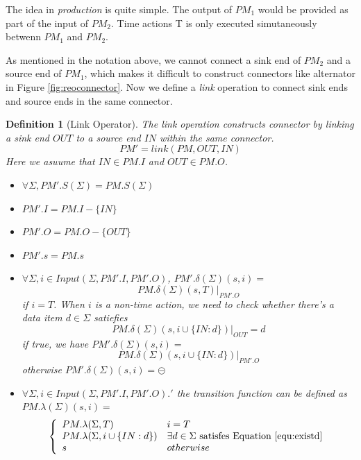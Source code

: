 \documentclass[conference, a4paper]{IEEEtran}
\newtheorem{definition}{Definition}
\newcommand{\rblock}[0]{\circleddash}
\begin{document}
The idea in \emph{production} is quite simple. The output of $PM_1$ would be provided as part of the
input of $PM_2$. Time actions T is only executed simutaneously betwenn $PM_1$ and $PM_2$.

As mentioned in the notation above, we cannot connect a sink end of $PM_2$ and a source end of
$PM_1$, which makes it difficult to construct connectors like alternator in Figure
\ref{fig:reoconnector}. Now we define a \emph{link} operation to connect sink ends and source ends
in the same connector.

\begin{definition}[Link Operator]
  The \emph{link} operation constructs connector by linking a sink end $OUT$ to a source end $IN$
  within the same connector.   
  \[
  PM' = link(PM, OUT, IN)
  \]
  Here we asuume that $IN\in PM.I$ and $OUT\in PM.O$.

  \begin{itemize}
  	\item[-] $\forall\Sigma, PM'.S(\Sigma)=PM.S(\Sigma)$
    \item[-] $PM'.I=PM.I-\{IN\}$
    \item[-] $PM'.O=PM.O-\{OUT\}$
    \item[-] $PM'.s=PM.s$
    \item[-] $\forall\Sigma, i\in Input(\Sigma,PM'.I,PM'.O)$, $PM'.\delta(\Sigma)(s, i)=$
      \begin{equation}
        \label{equ:existd}
        PM.\delta(\Sigma)(s,T)|_{PM'.O}
      \end{equation}
      if $i=T$. When $i$ is a non-time action, we need to check whether there's a data item
      $d\in\Sigma$
      satiefies
      \[
      PM.\delta(\Sigma)(s,i\cup\{IN:d\})|_{OUT} = d
      \]
      if \emph{true}, we have $PM'.\delta(\Sigma)(s, i)=$
      \[
      PM.\delta(\Sigma)(s,i\cup\{IN:d\})|_{PM'.O}
      \]
      otherwise $PM'.\delta(\Sigma)(s, i)=\rblock$
    \item[-] $\forall\Sigma, i\in Input(\Sigma,PM'.I,PM'.O).'$ the transition
      function can be defined as $PM.\lambda(\Sigma)(s,i)=$
      \begin{displaymath}
        \left\{
        \begin{array}[ht]{ll}
          PM.\lambda(\Sigma,T) & i=T \\
          PM.\lambda(\Sigma,i\cup\{IN:d\}) & \exists d\in\Sigma \mbox{ satisfes Equation
          \ref{equ:existd}} \\
          s & otherwise \\
        \end{array}
        \right.
      \end{displaymath}
  \end{itemize}
\end{definition}
\end{document}
